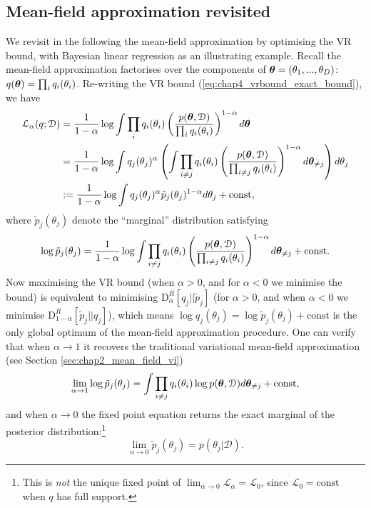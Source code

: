 \subsection{Mean-field approximation revisited}
\label{sec:chap4_mean_field}

We revisit in the following the mean-field approximation by optimising the VR bound, with Bayesian linear regression as an illustrating example. Recall the mean-field approximation factorises over the components of $\bm{\theta} = (\theta_1, ..., \theta_D)$: $q(\bm{\theta}) = \prod_{i} q_i(\theta_i)$. Re-writing the VR bound (\ref{eq:chap4_vrbound_exact_bound}), we have
\begin{equation*}
\begin{aligned}
\mathcal{L}_{\alpha}(q; \mathcal{D}) &= \frac{1}{1 - \alpha} \log \int \prod_i q_i(\theta_i)  \left( \frac{p(\bm{\theta}, \mathcal{D})}{\prod_i q_i(\theta_i)} \right)^{1 - \alpha} d\bm{\theta} \\
&= \frac{1}{1 - \alpha} \log \int q_j(\theta_j)^{\alpha} \left( \int \prod_{i \neq j} q_i(\theta_i)  \left( \frac{p(\bm{\theta}, \mathcal{D})}{\prod_{i \neq j} q_i(\theta_i)} \right)^{1 - \alpha} d\bm{\theta}_{\neq j} \right) d\theta_j \\
&:= \frac{1}{1 - \alpha} \log \int q_j(\theta_j)^{\alpha} \tilde{p}_j(\theta_j)^{1 - \alpha} d\theta_j + \text{const},
\end{aligned}
\end{equation*}
where $\tilde{p}_j(\theta_j)$ denote the ``marginal'' distribution satisfying
\begin{equation*}
\log \tilde{p}_j(\theta_j) = \frac{1}{1 - \alpha} \log \int \prod_{i \neq j} q_i(\theta_i)  \left( \frac{p(\bm{\theta}, \mathcal{D})}{\prod_{i \neq j} q_i(\theta_i)} \right)^{1 - \alpha} d\bm{\theta}_{\neq j} + \text{const}.
\end{equation*}
Now maximising the VR bound (when $\alpha > 0$, and for $\alpha < 0$ we minimise the bound) is equivalent to minimising $\mathrm{D}_{\alpha}^{R}[q_j||\tilde{p}_j]$ (for $\alpha > 0$, and when $\alpha < 0$ we minimise $\mathrm{D}_{1 - \alpha}^{R}[\tilde{p}_j||q_j]$), which means $\log q_j(\theta_j) = \log \tilde{p}_j(\theta_j) + \text{const}$ is the only global optimum of the mean-field approximation procedure. One can verify that when $\alpha \rightarrow 1$ it recovers the traditional variational mean-field approximation (see Section \ref{sec:chap2_mean_field_vi})
\begin{equation*}
\lim_{\alpha \rightarrow 1} \log \tilde{p}_j(\theta_j) = \int \prod_{i \neq j} q_i(\theta_i) \log p(\bm{\theta}, \mathcal{D}) d\bm{\theta}_{\neq j} + \text{const},
\end{equation*}
and when $\alpha \rightarrow 0$ the fixed point equation returns the exact marginal of the posterior distribution:\footnote{This is \emph{not} the unique fixed point of $\lim_{\alpha \rightarrow 0} \mathcal{L}_{\alpha} = \mathcal{L}_0$, since $\mathcal{L}_0 = \text{const}$ when $q$ has full support.} 
$$\lim_{\alpha \rightarrow 0} \tilde{p}_j(\theta_j) = p(\theta_j |\mathcal{D}).$$

